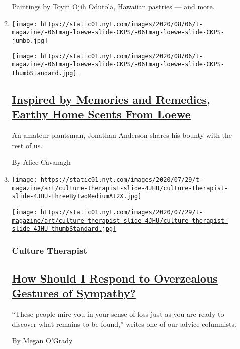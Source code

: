 \begin{enumerate}
\begin{enumerate}
    Paintings by Toyin Ojih Odutola, Hawaiian pastries --- and more.
  \item
    \texttt{[image: https://static01.nyt.com/images/2020/08/06/t-magazine/-06tmag-loewe-slide-CKPS/-06tmag-loewe-slide-CKPS-jumbo.jpg]}

    \href{/2020/08/06/t-magazine/loewe-home-scents-candles.html}{\texttt{[image: https://static01.nyt.com/images/2020/08/06/t-magazine/-06tmag-loewe-slide-CKPS/-06tmag-loewe-slide-CKPS-thumbStandard.jpg]}}

    \hypertarget{inspired-by-memories-and-remedies-earthy-home-scents-from-loewe}{%
    \subsection{\texorpdfstring{\href{/2020/08/06/t-magazine/loewe-home-scents-candles.html}{Inspired
    by Memories and Remedies, Earthy Home Scents From
    Loewe}}{Inspired by Memories and Remedies, Earthy Home Scents From Loewe}}\label{inspired-by-memories-and-remedies-earthy-home-scents-from-loewe}}

    An amateur plantsman, Jonathan Anderson shares his bounty with the
    rest of us.

    By Alice Cavanagh
  \item
    \texttt{[image: https://static01.nyt.com/images/2020/07/29/t-magazine/art/culture-therapist-slide-4JHU/culture-therapist-slide-4JHU-threeByTwoMediumAt2X.jpg]}

    \href{/2020/07/31/t-magazine/culture-therapist-grief.html}{\texttt{[image: https://static01.nyt.com/images/2020/07/29/t-magazine/art/culture-therapist-slide-4JHU/culture-therapist-slide-4JHU-thumbStandard.jpg]}}

    \hypertarget{culture-therapist}{%
    \subsubsection{Culture Therapist}\label{culture-therapist}}

    \hypertarget{how-should-i-respond-to-overzealous-gestures-of-sympathy}{%
    \subsection{\texorpdfstring{\href{/2020/07/31/t-magazine/culture-therapist-grief.html}{How
    Should I Respond to Overzealous Gestures of
    Sympathy?}}{How Should I Respond to Overzealous Gestures of Sympathy?}}\label{how-should-i-respond-to-overzealous-gestures-of-sympathy}}

    ``These people mire you in your sense of loss just as you are ready
    to discover what remains to be found,'' writes one of our advice
    columnists.

    By Megan O'Grady
  \end{enumerate}
\end{enumerate}

